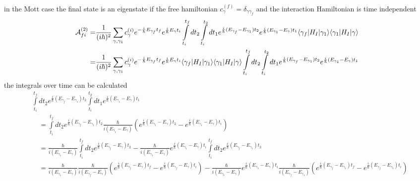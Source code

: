 in the Mott case the final state is an eigenstate if the free hamiltonian $c_{\gamma}^{(f)}=\delta_{\gamma\gamma_f}$ and the interaction Hamiltonian is time independent
\begin{align}
  {\cal A}_{fi}^{(2)} = & \frac{1}{(i\hbar)^2} \sum\limits_{\gamma,\gamma_1}c_{\gamma}^{(i)}e^{-\frac{i}{\hbar}E_{\gamma_f} t_f}e^{\frac{i}{\hbar}E_{\gamma} t_i}\int\limits_{t_i}^{t_f}dt_2\int\limits_{t_i}^{t_2}dt_1e^{\frac{i}{\hbar}(E_{\gamma_f}-E_{\gamma_1})t_2}e^{\frac{i}{\hbar}(E_{\gamma_1}-E_{\gamma})t_1}\langle \gamma_f |H_I| \gamma_1\rangle\langle \gamma_1 |H_I| \gamma\rangle\nonumber     \\
  =                     & \frac{1}{(i\hbar)^2} \sum\limits_{\gamma,\gamma_1}c_{\gamma}^{(i)}e^{-\frac{i}{\hbar}E_{\gamma_f} t_f}e^{\frac{i}{\hbar}E_{\gamma} t_i}\langle \gamma_f |H_I| \gamma_1\rangle\langle \gamma_1 |H_I| \gamma\rangle\int\limits_{t_i}^{t_f}dt_2\int\limits_{t_i}^{t_2}dt_1e^{\frac{i}{\hbar}(E_{\gamma_f}-E_{\gamma_1})t_2}e^{\frac{i}{\hbar}(E_{\gamma_1}-E_{\gamma})t_1}\label{defa2}
\end{align}
the integrals over time can be calculated
\begin{align}
  & \int\limits_{t_i}^{t_f}dt_2e^{\frac{i}{\hbar}(E_{\gamma_f}-E_{\gamma_1})t_2}\int\limits_{t_i}^{t_2}dt_1e^{\frac{i}{\hbar}(E_{\gamma_1}-E_{\gamma})t_1}\nonumber                                                                                                                                                                                                                                                                                                \\
  & \quad =\int\limits_{t_i}^{t_f}dt_2e^{\frac{i}{\hbar}(E_{\gamma_f}-E_{\gamma_1})t_2}\frac{\hbar}{i(E_{\gamma_1}-E_{\gamma})}\left(e^{\frac{i}{\hbar}(E_{\gamma_1}-E_{\gamma})t_2}-e^{\frac{i}{\hbar}(E_{\gamma_1}-E_{\gamma})t_i}\right)\nonumber                                                                                                                                                                                                               \\
  & \quad =\frac{\hbar}{i(E_{\gamma_1}-E_{\gamma})}\int\limits_{t_i}^{t_f}dt_2 e^{\frac{i}{\hbar}(E_{\gamma_f}-E_{\gamma})t_2}-\frac{\hbar}{i(E_{\gamma_1}-E_{\gamma})}e^{\frac{i}{\hbar}(E_{\gamma_1}-E_{\gamma})t_i}\int\limits_{t_i}^{t_f}dt_2e^{\frac{i}{\hbar}(E_{\gamma_f}-E_{\gamma_1})t_2}\nonumber                                                                                                                                                        \\
  & \quad =\frac{\hbar}{i(E_{\gamma_1}-E_{\gamma})}\frac{\hbar}{i(E_{\gamma_f}-E_{\gamma})}\left(e^{\frac{i}{\hbar}(E_{\gamma_f}-E_{\gamma})t_f}-e^{\frac{i}{\hbar}(E_{\gamma_f}-E_{\gamma})t_i}\right)-\frac{\hbar}{i(E_{\gamma_1}-E_{\gamma})}e^{\frac{i}{\hbar}(E_{\gamma_1}-E_{\gamma})t_i}\frac{\hbar}{i(E_{\gamma_f}-E_{\gamma_1})}\left(e^{\frac{i}{\hbar}(E_{\gamma_f}-E_{\gamma_1})t_f}-e^{\frac{i}{\hbar}(E_{\gamma_f}-E_{\gamma_1})t_i}\right)\nonumber \\
\end{align}
